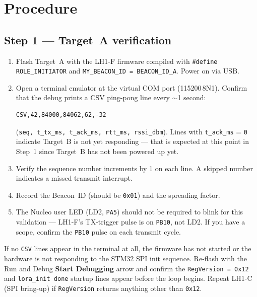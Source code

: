 \documentclass[11pt,letterpaper]{article}
\begin{document}
\newpage
\section{Procedure}

\subsection{Step 1 --- Target~A verification}
\begin{enumerate}[leftmargin=2em]
	\item Flash Target~A with the LH1-F firmware compiled with \texttt{\#define ROLE\_INITIATOR} and \texttt{MY\_BEACON\_ID = BEACON\_ID\_A}. Power on via USB.
	\item Open a terminal emulator at the virtual COM port (115200\,8N1). Confirm that the debug \UART{} prints a CSV ping-pong line every $\sim$1 second:
	\begin{verbatim}
CSV,42,84000,84062,62,-32
	\end{verbatim}
	(\texttt{seq, t\_tx\_ms, t\_ack\_ms, rtt\_ms, rssi\_dbm}). Lines with \texttt{t\_ack\_ms} = \texttt{0} indicate Target~B is not yet responding --- that is expected at this point in Step~1 since Target~B has not been powered up yet.
	\item Verify the sequence number increments by 1 on each line. A skipped number indicates a missed transmit interrupt.
	\item Record the Beacon~ID (should be \texttt{0x01}) and the spreading factor.
	\item The Nucleo user \mbox{LED} (LD2, \texttt{PA5}) should not be required to blink for this validation --- LH1-F's TX-trigger pulse is on \texttt{PB10}, not LD2. If you have a scope, confirm the \texttt{PB10} pulse on each transmit cycle.
\end{enumerate}

\begin{tcolorbox}[warning={SPI Bring-Up Regression}]
	If no \texttt{CSV} lines appear in the terminal at all, the firmware has not started or the \RF{} hardware is not responding to the STM32 \mbox{SPI} init sequence. Re-flash with the Run and Debug \textbf{Start Debugging} arrow and confirm the \texttt{RegVersion = 0x12} and \texttt{lora\_init done} startup lines appear before the loop begins. Repeat LH1-C (\mbox{SPI} bring-up) if \texttt{RegVersion} returns anything other than \texttt{0x12}.
\end{tcolorbox}
\end{document}
